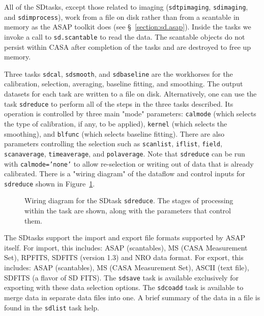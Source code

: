 All of the SDtasks, except  those related to imaging  ({\tt sdtpimaging}, {\tt sdimaging}, and {\tt sdimprocess}), 
work from a file on disk rather than from
a scantable in memory as the ASAP toolkit does (see 
\S~\ref{section:sd.asap}).  Inside the tasks we invoke a call
to {\tt sd.scantable} to read the data.  The scantable objects
do not persist within CASA after completion of the tasks and
are destroyed to free up memory. 

Three tasks {\tt sdcal}, {\tt sdsmooth}, and {\tt sdbaseline} are the
workhorses for the calibration, selection,
averaging, baseline fitting, and smoothing. The output datasets for
each task are written to a file on disk.
Alternatively, one can use the task {\tt sdreduce} to perform all of the steps in
the three tasks described. 
Its operation is
controlled by three main "mode" parameters: {\tt calmode} (which selects
the type of calibration, if any, to be applied), {\tt kernel} (which selects
the smoothing), and {\tt blfunc} (which selects baseline fitting).  There
are also parameters controlling the selection such as {\tt scanlist}, 
{\tt iflist}, {\tt field}, {\tt scanaverage}, {\tt timeaverage}, and
{\tt polaverage}.  Note that {\tt sdreduce} can be
run with {\tt calmode='none'} to allow re-selection or writing out of data
that is already calibrated.  There is a "wiring diagram" of the dataflow and control inputs for
{\tt sdreduce} shown in Figure~\ref{fig:sdreduce}.

\begin{figure}[h!]
\begin{center}
\caption{\label{fig:sdreduce} Wiring diagram for the SDtask {\tt sdreduce}.
The stages of processing within the task are shown, along with the
parameters that control them. }
\hrulefill
\end{center}
\end{figure}

The SDtasks support the import and export file formats supported
by ASAP itself.  For import, this includes:  ASAP (scantables), 
MS (CASA Measurement Set), RPFITS, SDFITS (version 1.3) and NRO data format.  
For export, this includes: ASAP (scantables), MS (CASA Measurement Set),
ASCII (text file), SDFITS (a flavor of SD FITS).
The {\tt sdsave} task is available exclusively for exporting with these
data selection options.  The {\tt sdcoadd} task is available to merge data in separate data files
into one.  A brief summary of the data in a file is found in the {\tt sdlist}
task help.

